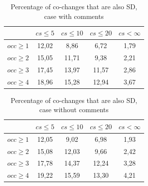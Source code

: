 \documentclass[12pt, a4paper, twoside]{report}
\begin{document}
\begin{table}[!h]
\renewcommand{\arraystretch}{1}
\caption{Percentage of co-changes that are also SD, case with comments}
\label{tab:percLD:comm}
\centering

\begin{tabular}{|c|c|c|c|c|}
\hline
	      &	$cs\leq 5$	&	$cs\leq 10$	&	$cs\leq 20$	&	$cs< \infty$	\\
\hline
$occ\geq 1$	&	12,02	&	8,86	&	6,72	&	1,79	\\
$occ\geq 2$	&	15,05	&	11,71	&	9,38	&	2,21	\\
$occ\geq 3$	&	17,45	&	13,97	&	11,57	&	2,86	\\
$occ\geq 4$	&	18,96	&	15,28	&	12,94	&	3,67	\\
\hline
\end{tabular}
\end{table}

\begin{table}[!h]
\renewcommand{\arraystretch}{1}
\caption{Percentage of co-changes that are also SD, case without comments}
\label{tab:percLD:nocomm}
\centering
\begin{tabular}{|c|c|c|c|c|}
\hline
	      &	$cs\leq 5$	&	$cs\leq 10$	&	$cs\leq 20$	&	$cs< \infty$	\\
\hline
$occ\geq 1$	&	12,05	&	9,02	&	6,98	&	1,93	\\
$occ\geq 2$	&	15,08	&	12,03	&	9,66	&	2,42	\\
$occ\geq 3$	&	17,78	&	14,37	&	12,24	&	3,28	\\
$occ\geq 4$	&	19,22	&	15,59	&	13,30	&	4,21	\\
\hline
\end{tabular}
\end{table}



\begin{table}[!h]
\renewcommand{\arraystretch}{1}
\caption{Percentage of SD that are also co-changing pairs after connection strength filtering. }
\label{tab:percSDstrength}
\centering
{}
\end{table}
\end{document}
